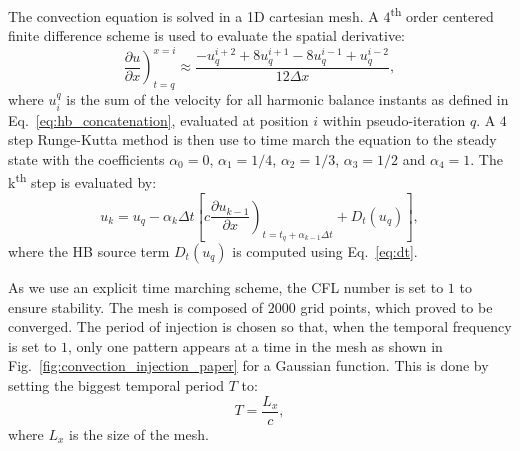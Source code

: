 The convection equation is solved in a 1D cartesian mesh.
A $4$\textsuperscript{th} order centered finite
difference scheme is used to evaluate the spatial derivative:
\begin{equation}
    \left. \frac{\partial u}{\partial x} \right)_{t=q}^{x=i} \approx 
    \frac{-u^{i+2}_{q} + 8 u^{i+1}_{q} - 8 u^{i-1}_{q} + u^{i-2}_{q}}{12\Delta x},
    \label{eq:convection_center4}
\end{equation}
where $u_i^q$ is the sum of the velocity for  
all harmonic balance instants as defined in Eq.~\eqref{eq:hb_concatenation},
evaluated at position $i$ within pseudo-iteration $q$.
A $4$ step Runge-Kutta method is then use to time 
march the equation to the steady state with the coefficients $\alpha_0 = 0$,
$\alpha_1 = 1/4$, $\alpha_2 = 1/3$, $\alpha_3 = 1/2$ and $\alpha_4 = 1$.
The k\textsuperscript{th} step is evaluated by:
\begin{equation}
    u_k = u_q - \alpha_k \Delta t \left [ 
          c \left. \frac{\partial u_{k-1}}{\partial x} \right)_{t=t_q + \alpha_{k-1} \Delta t}
          + D_t(u_q)
          \right],
    \label{eq:convection_rk4}
\end{equation}
where the HB source term $D_t(u_q)$ is computed using Eq.~\eqref{eq:dt}. 

As we use 
an explicit time marching scheme, the CFL number is set to $1$ to ensure stability.
The mesh is composed of $2000$ grid points, which proved to be converged.
The period of injection is chosen so that, when the temporal frequency is
set to $1$, only one pattern 
appears at a time in the mesh
as shown in Fig.~\ref{fig:convection_injection_paper} for a Gaussian function.
This is done by setting the biggest temporal period $T$ to:
\begin{equation}
   T = \frac{L_x}{c},
\end{equation}
where $L_x$ is the size of the mesh.


